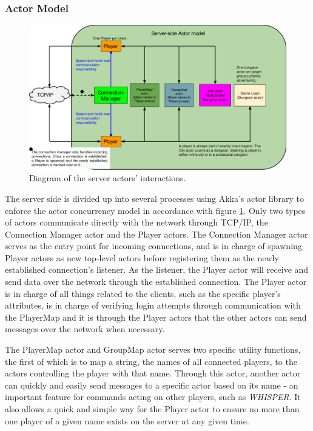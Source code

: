 \documentclass[a4paper]{article}
\begin{document}
\subsubsection{Actor Model}
\begin{figure}[ht]
\centering
\includegraphics[width=1.0\textwidth]{serveractormodel}
\caption{\label{fig:ServerActorModel}Diagram of the server actors' interactions.}
\end{figure}
The server side is divided up into several processes using Akka's actor library to enforce the actor concurrency model in accordance with figure \ref{fig:ServerActorModel}. Only two types 
of actors communicate directly with the network through TCP/IP, the Connection Manager actor and the Player actors. The Connection Manager actor serves as the entry point for incoming
connections, and is in charge of spawning Player actors as new top-level actors before registering them as the newly established connection's listener. As the listener, the Player actor
will receive and send data over the network through the established connection. The Player actor is in charge of all things related to the clients, such as the specific player's attributes,
is in charge of verifying login attempts through communication with the PlayerMap and it is through the Player actors that the other actors can send messages over the network when necessary.

The PlayerMap actor and GroupMap actor serves two specific utility functions, the first of which is to map a string, the names of all connected players, to the actors controlling the player 
with that name. Through this actor, another actor can quickly and easily send messages to a specific actor based on its name - an important feature for commands acting on other players, 
such as \textit{WHISPER}. It also allows a quick and simple way for the Player actor to ensure no more than one player of a given name exists on the server at any given time.
\end{document}
